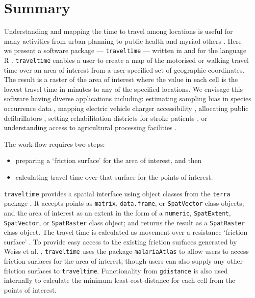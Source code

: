 \documentclass[
  10pt,
  letterpaper,
]{article}
\providecommand{\tightlist}{%
  \setlength{\itemsep}{0pt}\setlength{\parskip}{0pt}}\usepackage{longtable,booktabs,array}
\begin{document}

\section{Summary}\label{summary}

Understanding and mapping the time to travel among locations is useful
for many activities from urban planning \citep{zahavi1974traveltime} to
public health \citep{hulland2019travel, weiss2020global} and myriad
others \citep{nelson2019suite}. Here we present a software package ---
\texttt{traveltime} --- written in and for the language R \citep{Rref}.
\texttt{traveltime} enables a user to create a map of the motorised or
walking travel time over an area of interest from a user-specified set
of geographic coordinates. The result is a raster of the area of
interest where the value in each cell is the lowest travel time in
minutes to any of the specified locations. We envisage this software
having diverse applications including: estimating sampling bias in
species occurrence data \citep{dennis2000bias, reddy2003geographical},
mapping electric vehicle charger accessibility
\citep{falchetta2021electric}, allocating public defibrillators
\citep{tierney2018novel}, setting rehabilitation districts for stroke
patients \citep{padgham2019introduction}, or understanding access to
agricultural processing facilities \citep{zhao2023replanting}.

The work-flow requires two steps:

\begin{itemize}
\tightlist
\item
  preparing a `friction surface' for the area of interest, and then
\item
  calculating travel time over that surface for the points of interest.
\end{itemize}

\texttt{traveltime} provides a spatial interface using object classes
from the \texttt{terra} package \citep{terra}. It accepts points as
\texttt{matrix}, \texttt{data.frame}, or \texttt{SpatVector} class
objects; and the area of interest as an extent in the form of a
\texttt{numeric}, \texttt{SpatExtent}, \texttt{SpatVector}, or
\texttt{SpatRaster} class object; and returns the result as a
\texttt{SpatRaster} class object. The travel time is calculated as
movement over a resistance `friction surface' \citep{gdistance2017}. To
provide easy access to the existing friction surfaces generated by Weiss
et al. \citep{weiss2020global}, \texttt{traveltime} uses the package
\texttt{malariaAtlas} to allow users to access friction surfaces for the
area of interest; though users can also supply any other friction
surfaces to \texttt{traveltime}. Functionality from \texttt{gdistance}
\citep{gdistance2017} is also used internally to calculate the minimum
least-cost-distance for each cell from the points of interest.
\end{document}
